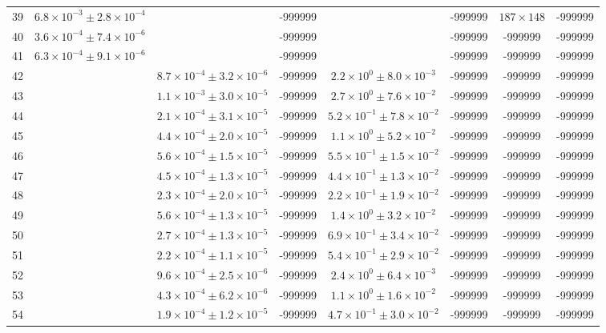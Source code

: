 \begin{table}
\begin{tabular}{cccccccc}
39 & $6.8\times10^{-3}\pm 2.8\times10^{-4}$ &  & -999999 &  & -999999 & $187\times 148$ & -999999 \\
40 & $3.6\times10^{-4}\pm 7.4\times10^{-6}$ &  & -999999 &  & -999999 & -999999 & -999999 \\
41 & $6.3\times10^{-4}\pm 9.1\times10^{-6}$ &  & -999999 &  & -999999 & -999999 & -999999 \\
42 &  & $8.7\times10^{-4}\pm 3.2\times10^{-6}$ & -999999 & $2.2\times10^{0}\pm 8.0\times10^{-3}$ & -999999 & -999999 & -999999 \\
43 &  & $1.1\times10^{-3}\pm 3.0\times10^{-5}$ & -999999 & $2.7\times10^{0}\pm 7.6\times10^{-2}$ & -999999 & -999999 & -999999 \\
44 &  & $2.1\times10^{-4}\pm 3.1\times10^{-5}$ & -999999 & $5.2\times10^{-1}\pm 7.8\times10^{-2}$ & -999999 & -999999 & -999999 \\
45 &  & $4.4\times10^{-4}\pm 2.0\times10^{-5}$ & -999999 & $1.1\times10^{0}\pm 5.2\times10^{-2}$ & -999999 & -999999 & -999999 \\
46 &  & $5.6\times10^{-4}\pm 1.5\times10^{-5}$ & -999999 & $5.5\times10^{-1}\pm 1.5\times10^{-2}$ & -999999 & -999999 & -999999 \\
47 &  & $4.5\times10^{-4}\pm 1.3\times10^{-5}$ & -999999 & $4.4\times10^{-1}\pm 1.3\times10^{-2}$ & -999999 & -999999 & -999999 \\
48 &  & $2.3\times10^{-4}\pm 2.0\times10^{-5}$ & -999999 & $2.2\times10^{-1}\pm 1.9\times10^{-2}$ & -999999 & -999999 & -999999 \\
49 &  & $5.6\times10^{-4}\pm 1.3\times10^{-5}$ & -999999 & $1.4\times10^{0}\pm 3.2\times10^{-2}$ & -999999 & -999999 & -999999 \\
50 &  & $2.7\times10^{-4}\pm 1.3\times10^{-5}$ & -999999 & $6.9\times10^{-1}\pm 3.4\times10^{-2}$ & -999999 & -999999 & -999999 \\
51 &  & $2.2\times10^{-4}\pm 1.1\times10^{-5}$ & -999999 & $5.4\times10^{-1}\pm 2.9\times10^{-2}$ & -999999 & -999999 & -999999 \\
52 &  & $9.6\times10^{-4}\pm 2.5\times10^{-6}$ & -999999 & $2.4\times10^{0}\pm 6.4\times10^{-3}$ & -999999 & -999999 & -999999 \\
53 &  & $4.3\times10^{-4}\pm 6.2\times10^{-6}$ & -999999 & $1.1\times10^{0}\pm 1.6\times10^{-2}$ & -999999 & -999999 & -999999 \\
54 &  & $1.9\times10^{-4}\pm 1.2\times10^{-5}$ & -999999 & $4.7\times10^{-1}\pm 3.0\times10^{-2}$ & -999999 & -999999 & -999999 \\

\end{tabular}
\end{table}
